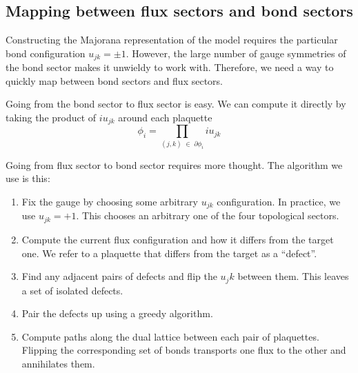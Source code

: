 \hypertarget{mapping-between-flux-sectors-and-bond-sectors}{%
\subsection{Mapping between flux sectors and bond sectors}\label{mapping-between-flux-sectors-and-bond-sectors}}

Constructing the Majorana representation of the model requires the particular bond configuration \(u_{jk} = \pm 1\). However, the large number of gauge symmetries of the bond sector makes it unwieldy to work with. Therefore, we need a way to quickly map between bond sectors and flux sectors.

Going from the bond sector to flux sector is easy. We can compute it directly by taking the product of \(i u_{jk}\) around each plaquette \[ \phi_i = \prod_{(j,k) \; \in \; \partial \phi_i} i u_{jk}\]

Going from flux sector to bond sector requires more thought. The algorithm we use is this:

\begin{enumerate}
\def\labelenumi{\arabic{enumi}.}
\item
  Fix the gauge by choosing some arbitrary \(u_{jk}\) configuration. In practice, we use \(u_{jk} = +1\). This chooses an arbitrary one of the four topological sectors.
\item
  Compute the current flux configuration and how it differs from the target one. We refer to a plaquette that differs from the target as a ``defect''.
\item
  Find any adjacent pairs of defects and flip the \(u_jk\) between them. This leaves a set of isolated defects.
\item
  Pair the defects up using a greedy algorithm.
\item
  Compute paths along the dual lattice between each pair of plaquettes. Flipping the corresponding set of bonds transports one flux to the other and annihilates them.
\end{enumerate}

